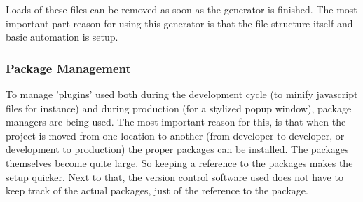 Loads of these files can be removed as soon as the generator is finished. The most important part reason for using this generator is that the file structure itself and basic automation is setup.

\subsubsection{Package Management}
To manage 'plugins' used both during the development cycle (to minify javascript files for instance) and during production (for a stylized popup window), package managers are being used. The most important reason for this, is that when the project is moved from one location to another (from developer to developer, or development to production) the proper packages can be installed. The packages themselves become quite large. So keeping a reference to the packages makes the setup quicker. Next to that, the version control software used does not have to keep track of the actual packages, just of the reference to the package.

